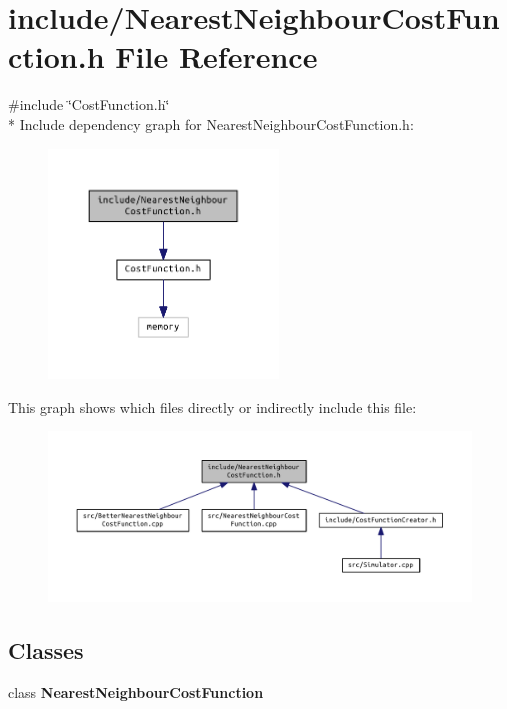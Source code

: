 \section{include/\+Nearest\+Neighbour\+Cost\+Function.h File Reference}
\label{_nearest_neighbour_cost_function_8h}
{\ttfamily \#include \char`\"{}Cost\+Function.\+h\char`\"{}}\\*
Include dependency graph for Nearest\+Neighbour\+Cost\+Function.\+h\+:\nopagebreak
\begin{figure}[H]
\begin{center}
\leavevmode
\includegraphics[width=173pt]{_nearest_neighbour_cost_function_8h__incl}
\end{center}
\end{figure}
This graph shows which files directly or indirectly include this file\+:\nopagebreak
\begin{figure}[H]
\begin{center}
\leavevmode
\includegraphics[width=350pt]{_nearest_neighbour_cost_function_8h__dep__incl}
\end{center}
\end{figure}
\subsection*{Classes}
\begin{DoxyCompactItemize}
\item 
class {\bf Nearest\+Neighbour\+Cost\+Function}
\end{DoxyCompactItemize}
